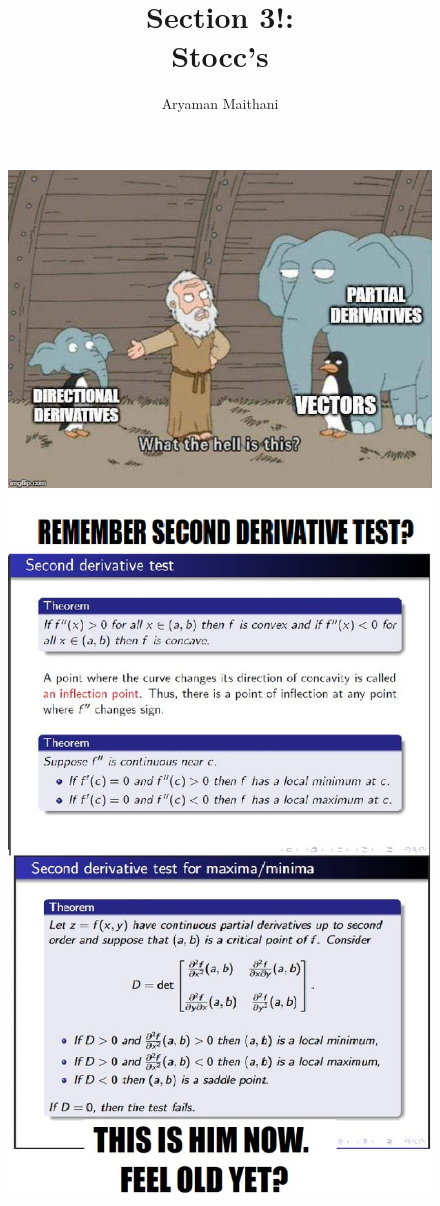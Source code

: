 \documentclass[handout, aspectratio=169]{beamer}
\begin{document}
\begin{frame} 
	\begin{figure}[t]
		\begin{minipage}{0.48\textwidth}
			\centering
			\includegraphics[width=7 cm]{23.jpg}
			
		\end{minipage}
		\begin{minipage}{0.48\textwidth}
			\centering
			\includegraphics[width=5 cm]{40.jpg}
			
		\end{minipage}
	\end{figure}
\end{frame}
\author{ }
\title{Section 3!:\\ Stocc's}
\begin{frame} 
	\titlepage
\end{frame}
\author{Aryaman Maithani}
\end{document}
